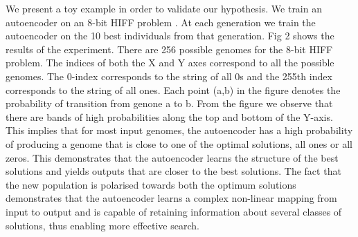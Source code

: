 \documentclass[runningheads,a4paper]{llncs}
\begin{document}

We present a toy example in order to validate our hypothesis. We train an autoencoder on an 8-bit HIFF problem \cite{Watson}. At each generation we train the autoencoder on the 10 best individuals from that generation. Fig 2 shows the results of the experiment. There are 256 possible genomes for the 8-bit HIFF problem. The indices of both the X and Y axes correspond to all the possible genomes. The 0-index corresponds to the string of all 0s and the 255th index corresponds to the string of all ones. Each point (a,b) in the figure denotes the probability of transition from genone a to b. From the figure we observe that there are bands of high probabilities along the top and bottom of the Y-axis. This implies that for most input genomes, the autoencoder has a high probability of producing a genome that is close to one of the optimal solutions, all ones or all zeros. This demonstrates that the autoencoder learns the structure of the best solutions and yields outputs that are closer to the best solutions. The fact that the new population is polarised towards both the optimum solutions demonstrates that the autoencoder learns a complex non-linear mapping from input to output and is capable of retaining information about several classes of solutions, thus enabling more effective search.  
\end{document}
